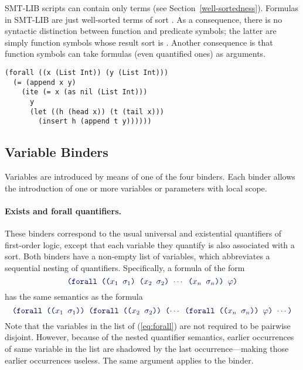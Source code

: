 \cTerms
\bigskip

SMT-LIB scripts can contain only  terms
(see Section~\ref{well-sortedness}).
Formulas in SMT-LIB are just well-sorted terms of sort .
As a consequence, there is no syntactic distinction 
between function and predicate symbols;
the latter are simply function symbols whose result sort is .
Another consequence is that function symbols can take formulas 
(even quantified ones) as arguments.

\begin{lstlisting}[linewidth=29em]
(forall ((x (List Int)) (y (List Int)))
  (= (append x y)
    (ite (= x (as nil (List Int)))
      y
      (let ((h (head x)) (t (tail x)))
        (insert h (append t y))))))
\end{lstlisting}


\subsection{Variable Binders}  \label{sec:binders}

Variables are introduced by means of one of the four binders.
Each binder allows the introduction of one or more variables 
or parameters with local scope.

\paragraph{Exists and forall quantifiers.}
These binders correspond 
to the usual universal and existential quantifiers of first-order logic,
except that each variable they quantify is also associated with a sort.
Both binders have a non-empty list of variables, 
which abbreviates a sequential nesting of quantifiers.
Specifically, a formula of the form
%
\begin{equation} \label{eq:forall}
\expr{
(forall (($x_1$ $\sigma_1$) ($x_2$ $\sigma_2$) $\cdots$ ($x_n$ $\sigma_n$)) 
  $\varphi$)
}
\end{equation}
%
has the same semantics as the formula
%
\begin{equation} \label{eq:nested-forall}
\expr{
 (forall (($x_1$ $\sigma_1$)) 
 (forall (($x_2$ $\sigma_2$)) ($\cdots$ 
 (forall (($x_n$ $\sigma_n$)) $\varphi$) $\cdots$)
}
\end{equation}
%
Note that the variables in the list 
of (\ref{eq:forall}) are not required to be pairwise disjoint.
However, because of the nested quantifier semantics, earlier occurrences 
of same variable in the list are shadowed by the last occurrence---making 
those earlier occurrences useless.
The same argument applies to the  binder.

